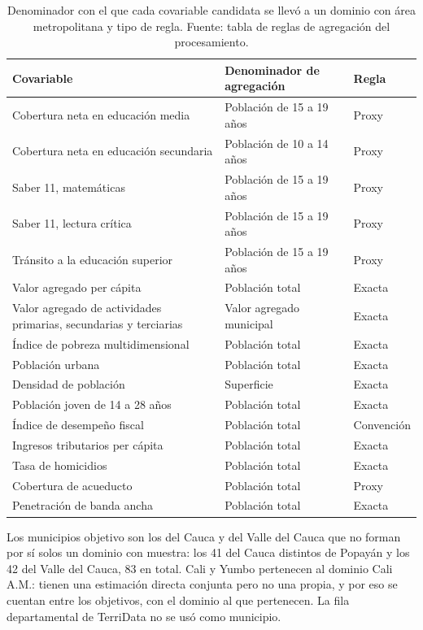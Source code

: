 \begin{table}[!htbp]
\centering
\footnotesize
\caption[Denominador de agregación de cada covariable]{Denominador con el que cada covariable candidata se llevó a un dominio con área metropolitana y tipo de regla. Fuente: tabla de reglas de agregación del procesamiento.}
\label{tab:met_agregacion}
\renewcommand{\arraystretch}{1.1}
\begin{tabularx}{\linewidth}{>{\raggedright\arraybackslash}p{5.4cm} >{\raggedright\arraybackslash}X l}
\toprule
Covariable & Denominador de agregación & Regla \\
\midrule
Cobertura neta en educación media & Población de 15 a 19 años & Proxy \\
Cobertura neta en educación secundaria & Población de 10 a 14 años & Proxy \\
Saber 11, matemáticas & Población de 15 a 19 años & Proxy \\
Saber 11, lectura crítica & Población de 15 a 19 años & Proxy \\
Tránsito a la educación superior & Población de 15 a 19 años & Proxy \\
Valor agregado per cápita & Población total & Exacta \\
Valor agregado de actividades primarias, secundarias y terciarias & Valor agregado municipal & Exacta \\
Índice de pobreza multidimensional & Población total & Exacta \\
Población urbana & Población total & Exacta \\
Densidad de población & Superficie & Exacta \\
Población joven de 14 a 28 años & Población total & Exacta \\
Índice de desempeño fiscal & Población total & Convención \\
Ingresos tributarios per cápita & Población total & Exacta \\
Tasa de homicidios & Población total & Exacta \\
Cobertura de acueducto & Población total & Proxy \\
Penetración de banda ancha & Población total & Exacta \\
\bottomrule
\end{tabularx}
\end{table}

Los municipios objetivo son los del Cauca y del Valle del Cauca que no forman por sí solos un dominio con muestra: los 41 del Cauca distintos de Popayán y los 42 del Valle del Cauca, 83 en total. Cali y Yumbo pertenecen al dominio Cali A.M.: tienen una estimación directa conjunta pero no una propia, y por eso se cuentan entre los objetivos, con el dominio al que pertenecen. La fila departamental de TerriData no se usó como municipio.

